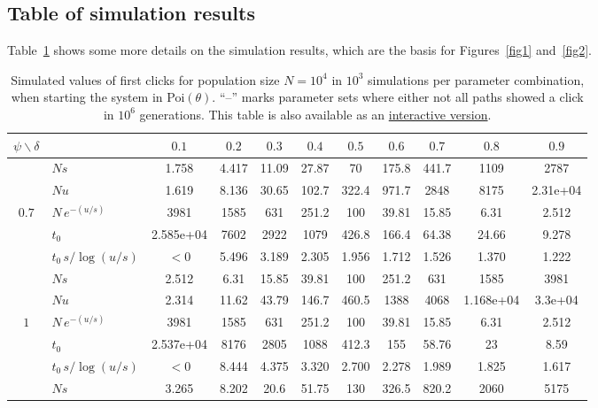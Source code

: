 \documentclass{imsart}
\theoremstyle{plain}
\theoremstyle{definition}
\begin{document}
\begin{appendix}
\section{Table of simulation results} \label{simtable}

\noindent
Table~\ref{tab1} shows some more details on the simulation results, which are the basis for Figures~\ref{fig1} and~\ref{fig2}.

\begin{table}[H]
\centering
\caption{\label{tab1} Simulated values of first clicks for population size $N=10^4$ in $10^3$ simulations per parameter combination, when starting the system in Poi$(\theta)$. ``--'' marks parameter sets where either not all paths showed a click in $10^6$ generations. This table is also available as an \href{https://pfaffelh.github.io/ratchet_figures/}{interactive version}.}
\setlength{\tabcolsep}{4pt}
\begin{adjustbox}{max width=\textwidth, max totalheight=0.9\textheight, center}
\scriptsize
\begin{tabular}{c lccccccccc}
\toprule
$\psi \backslash \delta$ &  & $0.1$ & $0.2$ & $0.3$ & $0.4$ & $0.5$ & $0.6$ & $0.7$ & $0.8$ & $0.9$ \\
\midrule
 & $Ns$ & 1.758 & 4.417 & 11.09 & 27.87 & 70 & 175.8 & 441.7 & 1109 & 2787 \\
 & $Nu$ & 1.619 & 8.136 & 30.65 & 102.7 & 322.4 & 971.7 & 2848 & 8175 & 2.31e+04 \\
$0.7$ & $N\,e^{-(u/s)}$ & 3981 & 1585 & 631 & 251.2 & 100 & 39.81 & 15.85 & 6.31 & 2.512 \\
 & $t_0$ & 2.585e+04 & 7602 & 2922 & 1079 & 426.8 & 166.4 & 64.38 & 24.66 & 9.278 \\
 & $t_0\,s/\log(u/s)$ & $<0$ & 5.496 & 3.189 & 2.305 & 1.956 & 1.712 & 1.526 & 1.370 & 1.222 \\
\midrule
 & $Ns$ & 2.512 & 6.31 & 15.85 & 39.81 & 100 & 251.2 & 631 & 1585 & 3981 \\
 & $Nu$ & 2.314 & 11.62 & 43.79 & 146.7 & 460.5 & 1388 & 4068 & 1.168e+04 & 3.3e+04 \\
$1$ & $N\,e^{-(u/s)}$ & 3981 & 1585 & 631 & 251.2 & 100 & 39.81 & 15.85 & 6.31 & 2.512 \\
 & $t_0$ & 2.537e+04 & 8176 & 2805 & 1088 & 412.3 & 155 & 58.76 & 23 & 8.59 \\
 & $t_0\,s/\log(u/s)$ & $<0$ & 8.444 & 4.375 & 3.320 & 2.700 & 2.278 & 1.989 & 1.825 & 1.617 \\
\midrule
 & $Ns$ & 3.265 & 8.202 & 20.6 & 51.75 & 130 & 326.5 & 820.2 & 2060 & 5175 \\

\end{tabular}
\end{adjustbox}
\end{table}
\end{appendix}
\end{document}
